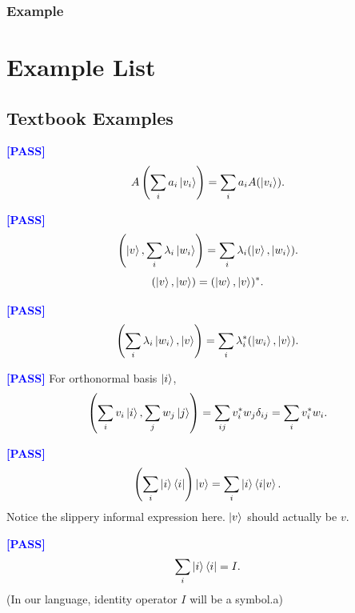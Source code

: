 \documentclass[manuscript, review, timestamp]{acmart}
\begin{document}
\subsubsection*{Example}


\newcommand{\tr}{\mathrm{tr}}
\newcommand{\pass}{\textcolor{blue}{\textbf{ [PASS] }}}
\newcommand{\fail}{\textcolor{red}{\textbf{ [FAIL] }}}

\section{Example List}

\subsection{Textbook Examples}

\begin{example}[QCQI (2.10)] \pass
  $$
  A\left( \sum_i a_i \ket{v_i} \right) = \sum_i a_i A(\ket{v_i}).
  $$
\end{example}

\begin{example}[QCQI (2.13)] \pass
  $$
  \left( \ket{v}, \sum_i \lambda_i \ket{w_i} \right) = \sum_i \lambda_i (\ket{v}, \ket{w_i}).
  $$
  $$
  (\ket{v}, \ket{w}) = (\ket{w}, \ket{v})^*.
  $$
\end{example}

\begin{example} \pass
  $$
  \left( \sum_i \lambda_i \ket{w_i}, \ket{v} \right) = \sum_i \lambda_i^* (\ket{w_i}, \ket{v}).
  $$
\end{example}

\begin{example}[QCQI (2.18)] \pass
  For orthonormal basis $\ket{i}$,
  $$
  \left( \sum_i v_i \ket{i}, \sum_j w_j \ket{j} \right) = \sum_{ij}v_i^*w_j \delta_{ij} = \sum_i v_i^* w_i.
  $$
\end{example}

\begin{example}[QCQI (2.21)] \pass
  $$
  \left( \sum_i \ket{i}\bra{i} \right) \ket{v} = \sum_i \ket{i} \braket{i|v}.
  $$
  Notice the slippery informal expression here. $\ket{v}$ should actually be $v$.
\end{example}

\begin{example}[QCQI (2.22)] \pass
  $$
  \sum_i\ket{i}\bra{i} = I.
  $$
  (In our language, identity operator $I$ will be a symbol.a)
\end{example}
\end{document}
